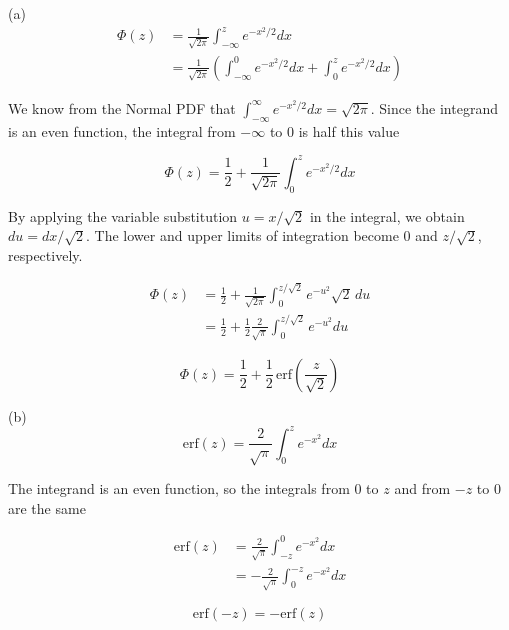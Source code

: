 (a)
\begin{equation*}
\begin{split}
\Phi(z)
&= \frac{1}{\sqrt{2\pi}} \int_{-\infty}^z e^{-x^2/2} dx \\
&= \frac{1}{\sqrt{2\pi}} \left( \int_{-\infty}^0 e^{-x^2/2} dx + \int_0^z e^{-x^2/2} dx \right)
\end{split}
\end{equation*}

We know from the Normal PDF that $\int_{-\infty}^{\infty} e^{-x^2/2} dx = \sqrt{2\pi}$. Since the integrand is an even function, the integral from $-\infty$ to $0$ is half this value

$$
\Phi(z) = \frac{1}{2} + \frac{1}{\sqrt{2\pi}} \int_0^z e^{-x^2/2} dx
$$

By applying the variable substitution $u = x/\sqrt{2}$ in the integral, we obtain $du = dx/\sqrt{2}$. The lower and upper limits of integration become $0$ and $z/\sqrt{2}$, respectively.

\begin{equation*}
\begin{split}
\Phi(z)
&= \frac{1}{2} + \frac{1}{\sqrt{2\pi}} \int_0^{z/\sqrt{2}} e^{-u^2} \sqrt{2} \, du \\
&= \frac{1}{2} + \frac{1}{2} \frac{2}{\sqrt{\pi}} \int_0^{z/\sqrt{2}} e^{-u^2} du
\end{split}
\end{equation*}

$$
\Phi(z) = \frac{1}{2} + \frac{1}{2} \, \mathrm{erf} \left( \frac{z}{\sqrt{2}} \right)
$$


(b)
$$
\mathrm{erf}(z) = \frac{2}{\sqrt{\pi}} \int_0^z e^{-x^2} dx
$$

The integrand is an even function, so the integrals from 0 to $z$ and from $-z$ to 0 are the same

\begin{equation*}
\begin{split}
\mathrm{erf}(z)
&= \frac{2}{\sqrt{\pi}} \int_{-z}^0 e^{-x^2} dx \\
&= - \frac{2}{\sqrt{\pi}} \int_0^{-z} e^{-x^2} dx
\end{split}
\end{equation*}

$$
\mathrm{erf}(-z) = -\mathrm{erf}(z)
$$
